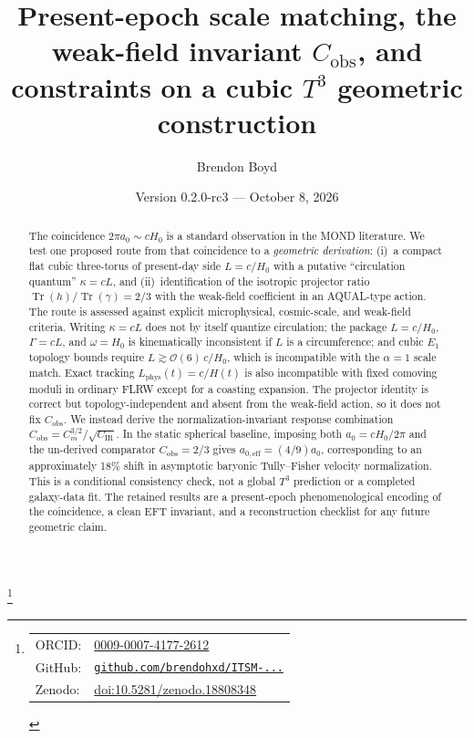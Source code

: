 \documentclass[aps,prd,reprint,superscriptaddress,nofootinbib,floatfix,showkeys]{revtex4-2}
\newcommand{\Tthree}{T^{3}}
\newcommand{\Cobs}{C_{\mathrm{obs}}}
\newcommand{\Cm}{C_{m}}
\newcommand{\CIR}{C_{\mathrm{IR}}}
\newcommand{\azero}{a_{0}}
\newcommand{\Hzero}{H_{0}}
\begin{document}
\title{Present-epoch scale matching, the weak-field invariant
\texorpdfstring{\(\Cobs\)}{C\_obs}, and constraints on a cubic
\texorpdfstring{\(\Tthree\)}{T3} geometric construction}

\author{Brendon Boyd}
\thanks{%
\begin{tabular}{@{}l@{\ }l@{}}
ORCID: & \href{https://orcid.org/0009-0007-4177-2612}{0009-0007-4177-2612} \\
GitHub: & \href{https://github.com/brendohxd/ITSM-Integrated-Toroidal-Syntropic-Model}{\texttt{github.com/brendohxd/ITSM-...}} \\
Zenodo: & \href{https://doi.org/10.5281/zenodo.18808348}{doi:10.5281/zenodo.18808348} \\
\end{tabular}%
}

\date{Version 0.2.0-rc3 --- October 8, 2026}

\begin{abstract}
The coincidence \(2\pi\azero\sim c\Hzero\) is a standard observation in the
MOND literature.  We test one proposed route from that coincidence to a
\emph{geometric derivation}: (i)~a compact flat cubic three-torus of present-day
side \(L=c/\Hzero\) with a putative ``circulation quantum'' \(\kappa=cL\), and
(ii)~identification of the isotropic projector ratio
\(\operatorname{Tr}(h)/\operatorname{Tr}(\gamma)=2/3\) with the weak-field
coefficient in an AQUAL-type action.  The route is assessed against explicit
microphysical, cosmic-scale, and weak-field criteria.  Writing \(\kappa=cL\)
does not by itself quantize circulation; the package \(L=c/\Hzero\),
\(\Gamma=cL\), and \(\omega=\Hzero\) is kinematically inconsistent if \(L\) is
a circumference; and cubic \(E_1\) topology bounds require
\(L\gtrsim\mathcal{O}(6)\,c/\Hzero\), which is incompatible with the
\(\alpha=1\) scale match.  Exact tracking \(L_{\mathrm{phys}}(t)=c/H(t)\) is
also incompatible with fixed comoving moduli in ordinary FLRW except for a
coasting expansion.  The projector identity is correct but
topology-independent and absent from the weak-field action, so it does not fix
\(\Cobs\).  We instead derive the normalization-invariant response combination
\(\Cobs=\Cm^{3/2}/\sqrt{\CIR}\).  In the static spherical baseline, imposing
both \(\azero=c\Hzero/2\pi\) and the un-derived comparator \(\Cobs=2/3\)
gives \(a_{0,\mathrm{eff}}=(4/9)\azero\), corresponding to an approximately
18\% shift in asymptotic baryonic Tully--Fisher velocity normalization.  This
is a conditional consistency check, not a global \(\Tthree\) prediction or a
completed galaxy-data fit.  The retained results are a present-epoch
phenomenological encoding of the coincidence, a clean EFT invariant, and a
reconstruction checklist for any future geometric claim.
\end{abstract}
\end{document}
